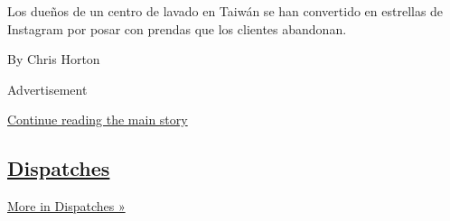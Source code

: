 \begin{enumerate}
  Los dueños de un centro de lavado en Taiwán se han convertido en
  estrellas de Instagram por posar con prendas que los clientes
  abandonan.

  By Chris Horton
\end{enumerate}

Advertisement

\protect\hyperlink{after-mid2}{Continue reading the main story}

\hypertarget{dispatches}{%
\subsection{\texorpdfstring{\href{/spotlight/dispatches-international}{Dispatches}}{Dispatches}}\label{dispatches}}

\href{/spotlight/dispatches-international}{More in Dispatches »}

